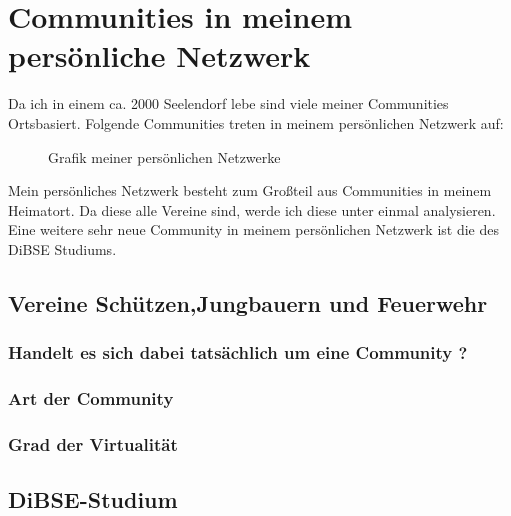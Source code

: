 \documentclass[12pt]{article}
\begin{document}
\section{Communities in meinem persönliche Netzwerk}
Da ich in einem ca. 2000 Seelendorf lebe sind viele meiner Communities Ortsbasiert. Folgende Communities treten in meinem persönlichen Netzwerk auf:
\begin{figure}[H]
\begin{center}
\end{center}
\caption{Grafik meiner persönlichen Netzwerke}
\end{figure}
\flushleft Mein persönliches Netzwerk besteht zum Großteil aus Communities in meinem Heimatort. Da diese alle Vereine sind, werde ich diese unter einmal analysieren. Eine weitere sehr neue Community in meinem persönlichen Netzwerk ist die des DiBSE Studiums.
\pagebreak
\subsection{Vereine Schützen,Jungbauern und Feuerwehr}
\subsubsection{Handelt es sich dabei tatsächlich um eine Community ?}
\subsubsection{Art der Community}
\subsubsection{Grad der Virtualität}
\subsection{DiBSE-Studium}
\end{document}
